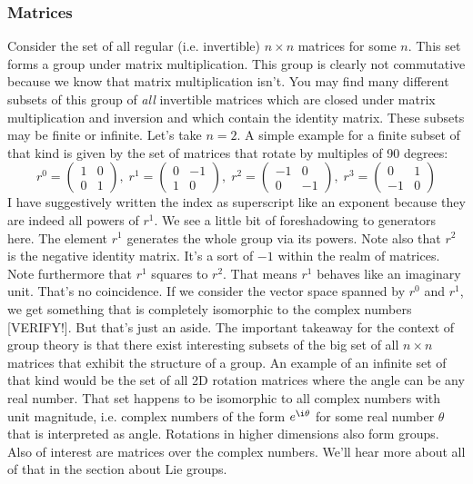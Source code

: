 \subsubsection{Matrices}
Consider the set of all regular (i.e. invertible) $n \times n$ matrices for some $n$. This set forms a group under matrix multiplication. This group is clearly not commutative because we know that matrix multiplication isn't. You may find many different subsets of this group of \emph{all} invertible matrices which are closed under matrix multiplication and inversion and which contain the identity matrix. These subsets may be finite or infinite. Let's take $n=2$. A simple example for a finite subset of that kind is given by the set of matrices that rotate by multiples of 90 degrees:
\begin{equation}
r^0 = \begin{pmatrix}  1 &  0 \\  0  &  1  \end{pmatrix}, \;
r^1 = \begin{pmatrix}  0 & -1 \\  1  &  0  \end{pmatrix}, \;
r^2 = \begin{pmatrix} -1 &  0 \\  0  & -1  \end{pmatrix}, \;
r^3 = \begin{pmatrix}  0 &  1 \\ -1  &  0  \end{pmatrix}
\end{equation}	
I have suggestively written the index as superscript like an exponent because they are indeed all powers of $r^1$. We see a little bit of foreshadowing to generators here. The element $r^1$ generates the whole group via its powers. Note also that $r^2$ is the negative identity matrix. It's a sort of $-1$ within the realm of matrices. Note furthermore that $r^1$ squares to $r^2$. That means $r^1$ behaves like an imaginary unit. That's no coincidence. If we consider the vector space spanned by $r^0$ and $r^1$, we get something that is completely isomorphic to the complex numbers [VERIFY!]. But that's just an aside. The important takeaway for the context of group theory is that there exist interesting subsets of the big set of all $n \times n$ matrices that exhibit the structure of a group. An example of an infinite set of that kind would be the set of all 2D rotation matrices where the angle can be any real number. That set happens to be isomorphic to all complex numbers with unit magnitude, i.e. complex numbers of the form $e^{\i \theta}$ for some real number $\theta$ that is interpreted as angle. Rotations in higher dimensions also form groups. Also of interest are matrices over the complex numbers. We'll hear more about all of that in the section about Lie groups.

